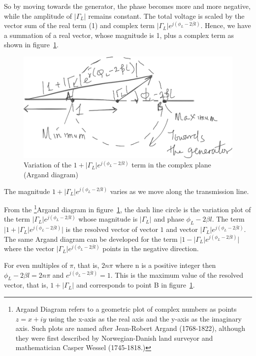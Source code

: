 So by moving towards the generator, the phase becomes more and more negative, while the amplitude of $|\Gamma_L|$ remains constant. The total voltage is scaled by the vector sum of the real term (1) and complex term $|\Gamma_L| e^{j(\phi_L -2 \beta l)}$. Hence, we have a summation of a real vector, whose magnitude is 1, plus a complex term as shown in figure~\ref{fig:kjhgfdwert}. 
\begin{figure}[h]
\centering
\includegraphics[width=0.8\linewidth]{./graphics/argand_diagram_temp}
\caption{Variation of the $1 + |\Gamma_L| e^{j(\phi_L -2 \beta l)}$ term in the complex plane (Argand diagram)}
\label{fig:kjhgfdwert}
\end{figure}

The magnitude $1+|\Gamma_L| e^{j(\phi_L -2 \beta l)}$ varies as we move along the transmission line.

From the \footnote{
Argand Diagram refers to a geometric plot of complex numbers as points $z = x + iy$ using the x-axis as the real axis and the y-axis as the imaginary axis. Such plots are named after Jean-Robert Argand (1768-1822), although they were first described by Norwegian-Danish land surveyor and mathematician Casper Wessel (1745-1818.)
}Argand diagram in figure~\ref{fig:kjhgfdwert}, the dash line circle is the variation plot of the term $\lvert\Gamma_L\rvert e^{j (\phi_L - 2\beta l)}$ whose magnitude is $\lvert \Gamma_L\rvert$ and phase $\phi_L - 2 \beta l$. The term $\lvert 1 + \lvert\Gamma_L\rvert e^{j (\phi_L - 2\beta l)}\rvert$ is the resolved vector of vector $1$ and vector $\lvert\Gamma_L\rvert e^{j (\phi_L - 2\beta l)}$. The same Argand diagram can be developed for the term $\lvert1 - \lvert\Gamma_L\rvert e^{j (\phi_L - 2\beta l)}\rvert$ where the vector $\lvert\Gamma_L\rvert e^{j (\phi_L - 2\beta l)}$ points in the negative direction. 

For even multiples of $\pi$, that is, $2n\pi$ where n is a positive integer then $\phi_L - 2\beta l = 2n\pi$ and $ e^{j(\phi_L - 2 \beta l)} = 1$. This is the maximum value of the resolved vector, that is, $1 + \lvert\Gamma_L\rvert$ and corresponds to point B in figure~\ref{fig:kjhgfdwert}.

